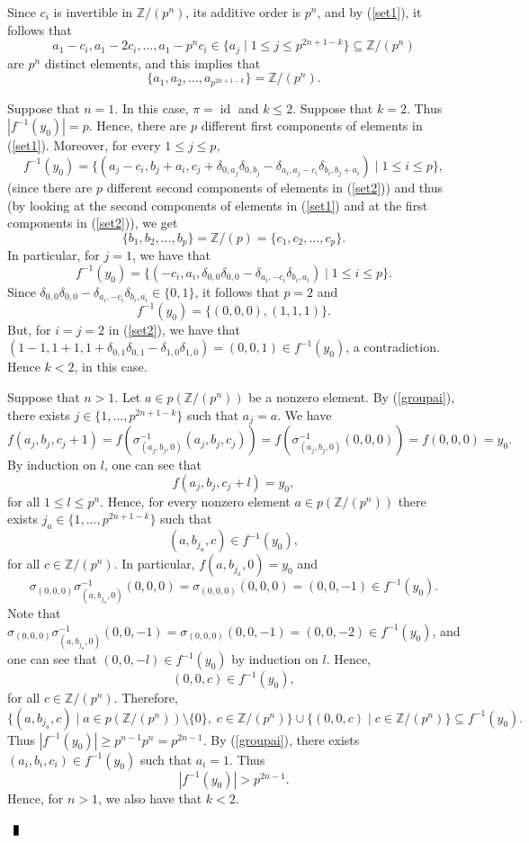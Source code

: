 \documentclass[10pt]{article}
\newcommand{\Z}{\mathbb{Z}}
\newcommand{\id}{\operatorname{id}}
\newenvironment{proof}{\par\noindent{ Proof.}}{$\qed$\par\bigskip}
\newcommand{\qed}{\enspace\vrule  height6pt  width4pt  depth2pt}
\begin{document}
\begin{proof}
Since $c_i$ is invertible in $\Z/(p^n)$, its additive order is
$p^n$, and by (\ref{set1}),  it follows that
$$a_1-c_i,a_1-2c_i,\dots ,a_1-p^{n}c_i\in \{a_j\mid 1\leq j\leq p^{2n+1-k}\}\subseteq\Z/(p^n)$$
are $p^n$ distinct elements, and this implies that
\begin{equation}\label{groupai}\{ a_1,a_2,\dots ,a_{p^{2n+1-k}}\}=\Z/(p^n).
    \end{equation}

Suppose that $n=1$. In this case, $\pi=\id$ and $k\leq 2$. Suppose
that $k=2$. Thus $|f^{-1}(y_0)|=p$. Hence, there are $p$ different
first components of elements in
    (\ref{set1}). Moreover, for every $1\leq j\leq p$,
\begin{equation}\label{set2}
    f^{-1}(y_0)=\{ (a_j-c_i,b_j+a_i,c_j+\delta_{0,a_j}\delta_{0,b_j}-\delta_{a_i,a_j-c_i}\delta_{b_i,b_j+a_i})\mid 1\leq i\leq p\},
\end{equation}
(since there are $p$ different second components of elements
    in (\ref{set2})) and thus (by looking at the second
    components of elements in (\ref{set1}) and at the first components
    in (\ref{set2})), we get
$$\{ b_1,b_2,\dots ,b_p\}=\Z/(p)=\{ c_1,c_2,\dots,c_p\}.$$
In particular, for $j=1$, we have that
$$  f^{-1}(y_0)=\{ (-c_i,a_i,\delta_{0,0}\delta_{0,0}-\delta_{a_i,-c_i}\delta_{b_i,a_i})\mid 1\leq i\leq p\}.$$
Since
$\delta_{0,0}\delta_{0,0}-\delta_{a_i,-c_i}\delta_{b_i,a_i}\in\{
0,1\}$, it follows that $p=2$ and
$$f^{-1}(y_0)=\{ (0,0,0), (1,1,1)\}.$$
But, for $i=j=2$ in (\ref{set2}), we have that
$(1-1,1+1,1+\delta_{0,1}\delta_{0,1}-\delta_{1,0}\delta_{1,0})=(0,0,1)\in
f^{-1}(y_0)$, a contradiction. Hence $k< 2$, in this case.



Suppose that $n>1$. Let $a\in p(\Z/(p^n))$ be a nonzero element.
By (\ref{groupai}), there exists $j\in\{ 1,\dots ,p^{2n+1-k}\}$
such that $a_j=a$. We have
$$f(a_j,b_j,c_j+1)=f(\sigma^{-1}_{(a_j,b_j,0)}(a_j,b_j,c_j))=
f(\sigma^{-1}_{(a_j,b_j,0)}(0,0,0))=f(0,0,0)=y_0.$$  By induction
on $l$, one can see that
$$f(a_j,b_j,c_j+l)=y_0,$$
for all $1\leq l\leq p^n$. Hence, for every nonzero element $a\in
p(\Z/(p^n))$ there exists $j_a\in\{ 1,\dots ,p^{2n+1-k}\}$ such
that
    $$(a,b_{j_a},c)\in f^{-1}(y_0), $$
    for all $c\in\Z/(p^n)$.
In particular, $f(a,b_{j_a},0)=y_0$
and
$$\sigma_{(0,0,0)}\sigma^{-1}_{(a,b_{j_a},0)}(0,0,0)=\sigma_{(0,0,0)}(0,0,0)=
(0,0,-1)\in f^{-1}(y_0).$$ Note that
$\sigma_{(0,0,0)}\sigma^{-1}_{(a,b_{j_a},0)}(0,0,-1)=\sigma_{(0,0,0)}(0,0,-1)=
(0,0,-2)\in f^{-1}(y_0)$, and one can see that $(0,0,-l)\in
f^{-1}(y_0)$ by induction on $l$.  Hence,
$$(0,0,c)\in f^{-1}(y_0),$$
for all $c\in \Z/(p^n)$. Therefore,
$$\{ (a,b_{j_a},c)\mid a\in p(\Z/(p^n))\setminus\{ 0\},\; c\in \Z/(p^n)\}\cup\{(0,0,c)\mid c\in \Z/(p^n)\}\subseteq f^{-1}(y_0).$$
Thus $|f^{-1}(y_0)|\geq p^{n-1}p^n=p^{2n-1}$. By (\ref{groupai}),
there exists $(a_i,b_i,c_i)\in f^{-1}(y_0)$ such that
$a_i=1$. Thus
$$|f^{-1}(y_0)|>p^{2n-1}.$$
Hence, for $n>1$, we also have that $k<2$.


\end{proof}
\end{document}
